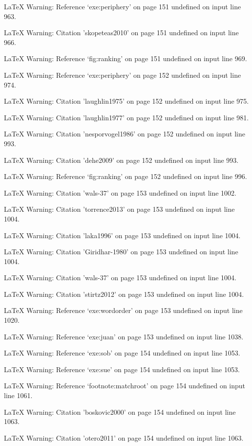 LaTeX Warning: Reference `exe:periphery' on page 151 undefined on input line 963.


LaTeX Warning: Citation 'skopeteas2010' on page 151 undefined on input line 966.


LaTeX Warning: Reference `fig:ranking' on page 151 undefined on input line 969.


LaTeX Warning: Reference `exe:periphery' on page 152 undefined on input line 974.


LaTeX Warning: Citation 'laughlin1975' on page 152 undefined on input line 975.


LaTeX Warning: Citation 'laughlin1977' on page 152 undefined on input line 981.


LaTeX Warning: Citation 'nesporvogel1986' on page 152 undefined on input line 993.


LaTeX Warning: Citation 'dehe2009' on page 152 undefined on input line 993.


LaTeX Warning: Reference `fig:ranking' on page 152 undefined on input line 996.


LaTeX Warning: Citation 'wals-37' on page 153 undefined on input line 1002.


LaTeX Warning: Citation 'torrence2013' on page 153 undefined on input line 1004.


LaTeX Warning: Citation 'laka1996' on page 153 undefined on input line 1004.


LaTeX Warning: Citation 'Giridhar-1980' on page 153 undefined on input line 1004.


LaTeX Warning: Citation 'wals-37' on page 153 undefined on input line 1004.


LaTeX Warning: Citation 'stirtz2012' on page 153 undefined on input line 1004.


LaTeX Warning: Reference `exe:wordorder' on page 153 undefined on input line 1020.


LaTeX Warning: Reference `exe:juan' on page 153 undefined on input line 1038.


LaTeX Warning: Reference `exe:sob' on page 154 undefined on input line 1053.


LaTeX Warning: Reference `exe:sue' on page 154 undefined on input line 1053.


LaTeX Warning: Reference `footnote:matchroot' on page 154 undefined on input line 1061.


LaTeX Warning: Citation 'boskovic2000' on page 154 undefined on input line 1063.


LaTeX Warning: Citation 'otero2011' on page 154 undefined on input line 1063.


